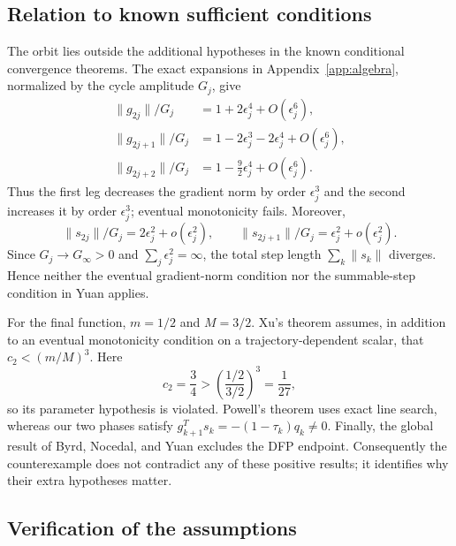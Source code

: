 \documentclass[smallextended,envcountsame]{svjour3}
\newcommand{\norm}[1]{\lVert #1\rVert}
\begin{document}
\subsection{Relation to known sufficient conditions}
\label{sec:known-results}

The orbit lies outside the additional hypotheses in the known conditional
convergence theorems.  The exact expansions in
Appendix~\ref{app:algebra}, normalized by the cycle amplitude $G_j$, give
\begin{align*}
\norm{g_{2j}}/G_j
 &=1+2\epsilon_j^4+O(\epsilon_j^6),\\
\norm{g_{2j+1}}/G_j
 &=1-2\epsilon_j^3-2\epsilon_j^4+O(\epsilon_j^6),\\
\norm{g_{2j+2}}/G_j
 &=1-\frac92\epsilon_j^4+O(\epsilon_j^6).
\end{align*}
Thus the first leg decreases the gradient norm by order $\epsilon_j^3$ and
the second increases it by order $\epsilon_j^3$; eventual monotonicity fails.
Moreover,
\[
\norm{s_{2j}}/G_j=2\epsilon_j^2+o(\epsilon_j^2),
\qquad
\norm{s_{2j+1}}/G_j=\epsilon_j^2+o(\epsilon_j^2).
\]
Since $G_j\to G_\infty>0$ and
$\sum_j\epsilon_j^2=\infty$, the total step length
$\sum_k\norm{s_k}$ diverges.  Hence neither the eventual gradient-norm
condition nor the summable-step condition in Yuan \cite{Yuan1995} applies.

For the final function, $m=1/2$ and $M=3/2$.  Xu's theorem
\cite{Xu1997} assumes, in addition to an eventual monotonicity condition on a
trajectory-dependent scalar, that $c_2<(m/M)^3$.  Here
\[
c_2=\frac34>\left(\frac{1/2}{3/2}\right)^3=\frac1{27},
\]
so its parameter hypothesis is violated.  Powell's theorem
\cite{Powell1971} uses exact line search, whereas our two phases satisfy
$g_{k+1}^Ts_k=-(1-\tau_k)q_k\ne0$.  Finally, the global result of Byrd,
Nocedal, and Yuan \cite{ByrdNocedalYuan1987} excludes the DFP endpoint.
Consequently the counterexample does not contradict any of these positive
results; it identifies why their extra hypotheses matter.

\subsection{Verification of the assumptions}
\end{document}
